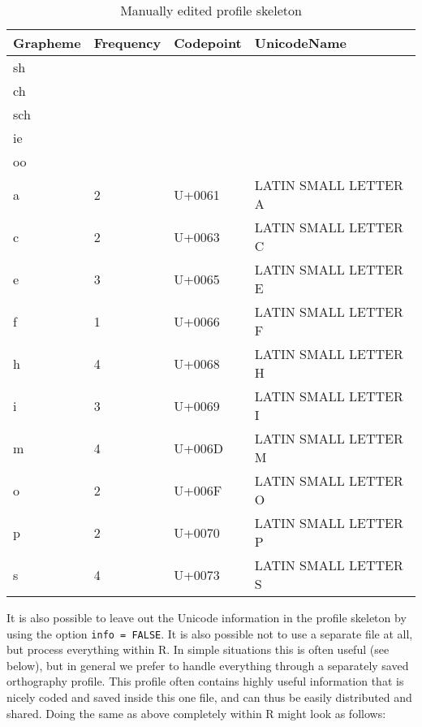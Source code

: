\documentclass[output=inprep,
		biblatex
		]{LSP/langsci}\usepackage[]{graphicx}\usepackage[]{color}
\begin{document}
\begin{table}[htb]
\centering
\begingroup\scriptsize
\begin{tabular}{llll}
  \toprule
Grapheme & Frequency & Codepoint & UnicodeName \\ 
  \midrule
sh &  &  &  \\ 
  ch &  &  &  \\ 
  sch &  &  &  \\ 
  ie &  &  &  \\ 
  oo &  &  &  \\ 
  a & 2 & U+0061 & LATIN SMALL LETTER A \\ 
  c & 2 & U+0063 & LATIN SMALL LETTER C \\ 
  e & 3 & U+0065 & LATIN SMALL LETTER E \\ 
  f & 1 & U+0066 & LATIN SMALL LETTER F \\ 
  h & 4 & U+0068 & LATIN SMALL LETTER H \\ 
  i & 3 & U+0069 & LATIN SMALL LETTER I \\ 
  m & 4 & U+006D & LATIN SMALL LETTER M \\ 
  o & 2 & U+006F & LATIN SMALL LETTER O \\ 
  p & 2 & U+0070 & LATIN SMALL LETTER P \\ 
  s & 4 & U+0073 & LATIN SMALL LETTER S \\ 
   \bottomrule
\end{tabular}
\endgroup
\caption{Manually edited profile skeleton} 
\label{tab:profile_skeleton1}
\end{table}


It is also possible to leave out the Unicode information in
the profile skeleton by using the option \texttt{info = FALSE}. It is also
possible not to use a separate file at all, but process everything within R. In
simple situations this is often useful (see below), but in general we prefer to
handle everything through a separately saved orthography profile. This profile
often contains highly useful information that is nicely coded and saved inside
this one file, and can thus be easily distributed and shared. Doing the same as
above completely within R might look as follows:
\end{document}
